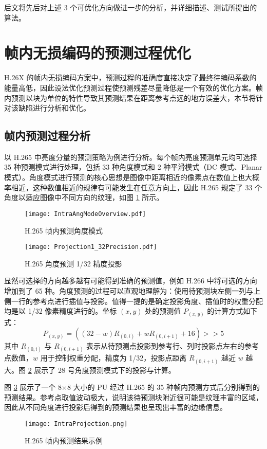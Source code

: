 后文将先后对上述 3 个可优化方向做进一步的分析，并详细描述、测试所提出的算法。

\section{帧内无损编码的预测过程优化}
H.26X 的帧内无损编码方案中，预测过程的准确度直接决定了最终待编码系数的能量高低，因此设法优化预测过程使预测残差尽量降低是一个有效的优化方案。帧内预测以块为单位的特性导致其预测结果在距离参考点远的地方误差大，本节将针对该缺陷进行分析和优化。

\subsection{帧内预测过程分析}
\label{cha:IntraPredDetail}
以 H.265 中亮度分量的预测策略为例进行分析。每个帧内亮度预测单元均可选择 35 种预测模式进行处理，包括 33 种角度模式和 2 种平滑模式（DC 模式、Planar 模式）。角度模式进行预测的核心思想是图像中距离相近的像素点在数值上也大概率相近，这种数值相近的规律有可能发生在任意方向上，因此 H.265 规定了 33 个角度以适应图像中不同方向的纹理，如图 \ref{fig:IntraAngModeOverview} 所示。
\begin{figure}[hbt]
    \centering
    \texttt{[image: IntraAngModeOverview.pdf]}
    \caption{H.265 帧内预测角度模式}
    \label{fig:IntraAngModeOverview}
\end{figure}
\begin{figure}[hbt]
    \centering
    \texttt{[image: Projection1\_32Precision.pdf]}
    \caption{H.265 角度预测 1/32 精度投影}
    \label{fig:Projection1_32Precision}
\end{figure}
显然可选择的方向越多越有可能得到准确的预测值，例如 H.266 中将可选的方向增加到了 65 种。角度预测的过程可以直观地理解为：使用待预测块左侧一列与上侧一行的参考点进行插值与投影。值得一提的是确定投影角度、插值时的权重分配均是以 1/32 像素精度进行的。坐标 $(x,y)$ 处的预测值 $P_{(x,y)}$ 的计算方式如下式：
\begin{equation}
    P_{(x,y)}=((32-w)R_{(0,i)}+wR_{(0,i+1)}+16)>>5
    \label{equ:IntraProjection}
\end{equation}
其中 $R_{(0,i)}$ 与 $R_{(0,i+1)}$ 表示从待预测点投影到参考行、列时投影点左右的参考点数值，$w$ 用于控制权重分配，精度为 1/32，投影点距离 $R_{(0,i+1)}$ 越近 $w$ 越大。图 \ref{fig:Projection1_32Precision} 展示了 28 号角度预测模式下的投影与计算。

图 \ref{fig:IntraProjection} 展示了一个 8$\times$8 大小的 PU 经过 H.265 的 35 种帧内预测方式后分别得到的预测结果。参考点取值波动极大，说明该待预测块附近很可能是纹理丰富的区域，因此从不同角度进行投影后得到的预测结果也呈现出丰富的边缘信息。
\begin{figure}[hbt]
    \centering
    \texttt{[image: IntraProjection.png]}
    \caption{H.265 帧内预测结果示例}
    \label{fig:IntraProjection}
\end{figure}

